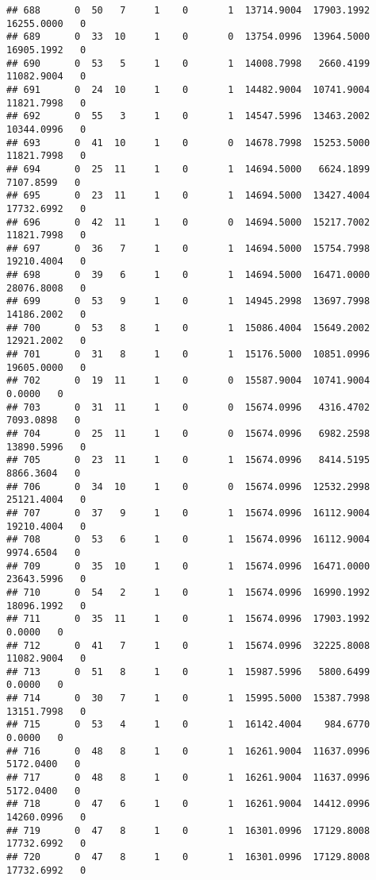 \documentclass[
]{article}
\begin{document}
\begin{enumerate}
\begin{verbatim}
## 688      0  50   7     1    0       1  13714.9004  17903.1992  16255.0000   0
## 689      0  33  10     1    0       0  13754.0996  13964.5000  16905.1992   0
## 690      0  53   5     1    0       1  14008.7998   2660.4199  11082.9004   0
## 691      0  24  10     1    0       1  14482.9004  10741.9004  11821.7998   0
## 692      0  55   3     1    0       1  14547.5996  13463.2002  10344.0996   0
## 693      0  41  10     1    0       0  14678.7998  15253.5000  11821.7998   0
## 694      0  25  11     1    0       1  14694.5000   6624.1899   7107.8599   0
## 695      0  23  11     1    0       1  14694.5000  13427.4004  17732.6992   0
## 696      0  42  11     1    0       0  14694.5000  15217.7002  11821.7998   0
## 697      0  36   7     1    0       1  14694.5000  15754.7998  19210.4004   0
## 698      0  39   6     1    0       1  14694.5000  16471.0000  28076.8008   0
## 699      0  53   9     1    0       1  14945.2998  13697.7998  14186.2002   0
## 700      0  53   8     1    0       1  15086.4004  15649.2002  12921.2002   0
## 701      0  31   8     1    0       1  15176.5000  10851.0996  19605.0000   0
## 702      0  19  11     1    0       0  15587.9004  10741.9004      0.0000   0
## 703      0  31  11     1    0       0  15674.0996   4316.4702   7093.0898   0
## 704      0  25  11     1    0       0  15674.0996   6982.2598  13890.5996   0
## 705      0  23  11     1    0       1  15674.0996   8414.5195   8866.3604   0
## 706      0  34  10     1    0       0  15674.0996  12532.2998  25121.4004   0
## 707      0  37   9     1    0       1  15674.0996  16112.9004  19210.4004   0
## 708      0  53   6     1    0       1  15674.0996  16112.9004   9974.6504   0
## 709      0  35  10     1    0       1  15674.0996  16471.0000  23643.5996   0
## 710      0  54   2     1    0       1  15674.0996  16990.1992  18096.1992   0
## 711      0  35  11     1    0       1  15674.0996  17903.1992      0.0000   0
## 712      0  41   7     1    0       1  15674.0996  32225.8008  11082.9004   0
## 713      0  51   8     1    0       1  15987.5996   5800.6499      0.0000   0
## 714      0  30   7     1    0       1  15995.5000  15387.7998  13151.7998   0
## 715      0  53   4     1    0       1  16142.4004    984.6770      0.0000   0
## 716      0  48   8     1    0       1  16261.9004  11637.0996   5172.0400   0
## 717      0  48   8     1    0       1  16261.9004  11637.0996   5172.0400   0
## 718      0  47   6     1    0       1  16261.9004  14412.0996  14260.0996   0
## 719      0  47   8     1    0       1  16301.0996  17129.8008  17732.6992   0
## 720      0  47   8     1    0       1  16301.0996  17129.8008  17732.6992   0

\end{verbatim}
\end{enumerate}
\end{document}
